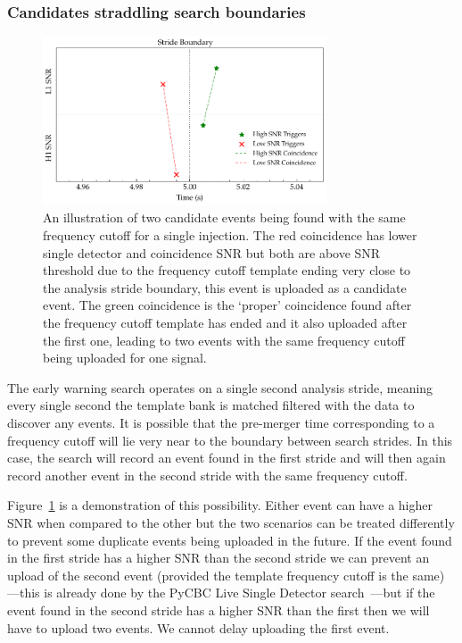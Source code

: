 \subsubsection{\label{6:sec:cands-across-bounds}Candidates straddling search boundaries}
%
\begin{figure}
       \centering
    \includegraphics[width=0.75\textwidth]{images/6_earlywarning/identified-problems/cands_across_bounds.pdf}
    \caption{An illustration of two candidate events being found with the same frequency cutoff for a single injection. The red coincidence has lower single detector and coincidence SNR but both are above SNR threshold due to the frequency cutoff template ending very close to the analysis stride boundary, this event is uploaded as a candidate event. The green coincidence is the `proper' coincidence found after the frequency cutoff template has ended and it also uploaded after the first one, leading to two events with the same frequency cutoff being uploaded for one \gwadj signal.}
    \label{6:fig:candidates_across_boundaries}
\end{figure}
%

The early warning search operates on a single second analysis stride, meaning every single second the template bank is matched filtered with the data to discover any \gwadj events. It is possible that the pre-merger time corresponding to a frequency cutoff will lie very near to the boundary between search strides. In this case, the search will record an event found in the first stride and will then again record another event in the second stride with the same frequency cutoff.

Figure~\ref{6:fig:candidates_across_boundaries} is a demonstration of this possibility. Either event can have a higher SNR when compared to the other but the two scenarios can be treated differently to prevent some duplicate events being uploaded in the future. If the event found in the first stride has a higher SNR than the second stride we can prevent an upload of the second event (provided the template frequency cutoff is the same)---this is already done by the PyCBC Live Single Detector search~\cite{PyCBC_singles:2022}---but if the event found in the second stride has a higher SNR than the first then we will have to upload two events. We cannot delay uploading the first event.


